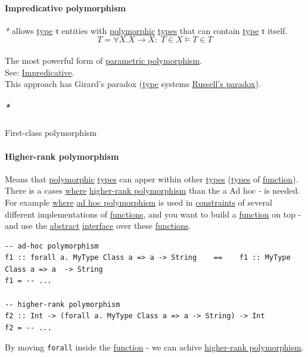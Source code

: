 \documentclass[11pt]{article}
\begin{document}
\paragraph{\label{orga662975}Impredicative polymorphism}
\label{sec:orgaeb562e}
\emph{*} allows \hyperref[org4fbaeb8]{type} τ entities with \hyperref[org84d7fee]{polymorphic} \hyperref[org3927fd9]{types} that can contain \hyperref[org4fbaeb8]{type} τ itself.\\
$$ T = \forall X. X \to X : \; T \in X \vDash T \in T $$\\

The most powerful form of \hyperref[org9b7bee7]{parametric polymorphism}.\\
See: \hyperref[orgb8e2e94]{Impredicative}.\\

This approach has Girard's paradox (\hyperref[org4fbaeb8]{type} systems \hyperref[orgfc3e54f]{Russell's paradox}).\\

\subparagraph{\emph{*}}
\label{sec:org962f15b}

\label{org66635d5}First-class polymorphism\\

\paragraph{\label{org9767217}Higher-rank polymorphism}
\label{sec:org234d38b}
Means that \hyperref[org84d7fee]{polymorphic} \hyperref[org3927fd9]{types} can apper within other \hyperref[org3927fd9]{types} (\hyperref[org3927fd9]{types} of \hyperref[orgeb5cddb]{function}).\\
There is a cases \hyperref[orgefd1ecd]{where} \hyperref[org9767217]{higher-rank polymorphism} than the a Ad hoc - is needed. For example \hyperref[orgefd1ecd]{where} \hyperref[orgdf8c6be]{ad hoc polymorphism} is used in \hyperref[org76311a9]{constraints} of several different implementations of \hyperref[org66c5288]{functions}, and you want to build a \hyperref[orgeb5cddb]{function} on top - and use the \hyperref[org606d002]{abstract} \hyperref[orge564553]{interface} over these \hyperref[org66c5288]{functions}.\\
\begin{verbatim}
-- ad-hoc polymorphism
f1 :: forall a. MyType Class a => a -> String    ==    f1 :: MyType Class a => a  -> String
f1 = -- ...

-- higher-rank polymorphism
f2 :: Int -> (forall a. MyType Class a => a -> String) -> Int
f2 = -- ...
\end{verbatim}
By moving \texttt{forall} inside the \hyperref[orgeb5cddb]{function} - we can achive \hyperref[org9767217]{higher-rank polymorphism}.\\
\end{document}
